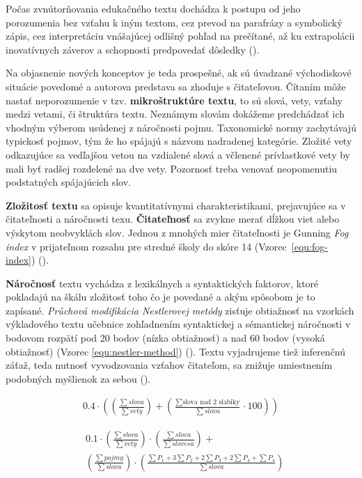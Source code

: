Počas zvnútorňovania edukačného textu dochádza k postupu od jeho porozumenia bez vzťahu k iným textom, cez prevod na parafrázy a symbolický zápis, cez interpretáciu vnášajúcej odlišný pohľad na prečítané, až ku extrapolácii inovatívnych záverov a schopnosti predpovedať dôsledky (\cite{gavora_ziak_1992}). 

Na objasnenie nových konceptov je teda prospešné, ak sú úvadzané východiskové situácie povedomé a autorova predstava sa zhoduje s čitateľovou. Čítaním môže nastať neporozumenie v tzv. \textbf{mikroštruktúre textu}, to sú slová, vety, vzťahy medzi vetami, či štruktúra textu. Neznámym slovám dokážeme predchádzať ich vhodným výberom usúdenej z náročnosti pojmu. Taxonomické normy zachytávajú typickosť pojmov, tým že ho spájajú s názvom nadradenej kategórie. Zložité vety odkazujúce sa vedľajšou vetou na vzdialené slová a včlenené prívlastkové vety by mali byť radšej rozdelené na dve vety. Pozornosť treba venovať neopomenutiu podstatných spájajúcich slov. 

\textbf{Zložitosť textu} sa opisuje kvantitatívnymi charakteristikami, prejavujúce sa v čitateľnosti a náročnosti texu. \textbf{Čitateľnosť} sa zvykne merať dĺžkou viet alebo výskytom neobvyklách slov. Jednou z mnohých mier čitateľnosti je Gunning \emph{Fog index} v prijateľnom rozsahu pre stredné školy do skóre 14 (Vzorec~\ref{equ:fog-index}) (\cite{drahosova_hodnotenie_2014}). 

\textbf{Náročnosť} textu vychádza z lexikálnych a syntaktických faktorov, ktoré pokladajú na škálu zložitosť toho čo je povedané a akým spôsobom je to zapísané. \emph{Průchová modifikácia Nestlerovej metódy} zisťuje obtiažnosť na vzorkách výkladového textu učebnice zohľadnením syntaktickej a sémantickej náročnosti  v bodovom rozpätí pod 20 bodov (nízka obtiažnosť) a nad 60 bodov (vysoká obtiažnosť) (Vzorec \ref{equ:nestler-method}) (\cite{drahosova_hodnotenie_2014}). Textu vyjadrujeme tiež inferenčnú záťaž, teda nutnosť vyvodzovania vzťahov čitateľom, sa znižuje umiestnením podobných myšlienok za sebou (\cite{pavlovkin_ziak_1989}).

\begin{ceqn}\begin{align}
0.4 \cdot \left(\left(\frac{\sum slova}{\sum vety}\right) + 
\left(\frac{\sum \text{slova nad 2 slabiky}}{\sum slova}\cdot 100\right)\right)
\label{equ:fog-index}
\end{align}\end{ceqn}

\begin{equation}\begin{split}
& 0.1 \cdot \left(\frac{\sum slova}{\sum vety}\right) \cdot  \left(\frac{\sum slova}{\sum slovesa}\right) + \\
& \left(\frac{\sum pojmy}{\sum slova}\right) \cdot \left(\frac{\sum P_1 + 3\sum P_2 + 2\sum P_3 + 2\sum P_4 + \sum P_4}{\sum slova}\right)
\label{equ:nestler-method}
\end{split}\end{equation}

